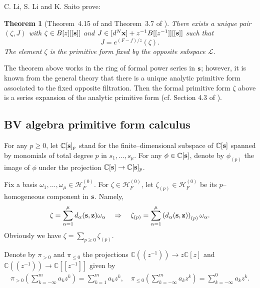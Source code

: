 \documentclass[12pt,a4paper]{amsart}
\newcommand{\CC}{{\mathbb{C}}}
\newcommand{\bx}{{\bf x}}
\newcommand{\bz}{{\bf z}}
\def\H{{\mathcal H}}
\def\L{{\mathcal L}}
\newcommand{\<}{\left<}
\renewcommand{\>}{\right>}
\newcommand{\bs}{{\bf s}}
\newtheorem{theorem}{Theorem}[section]
\numberwithin{equation}{section}
\begin{document}
C. Li, S. Li and K. Saito prove:
\begin{theorem}[Theorem~4.15 of \cite{LLS} and Theorem~3.7 of \cite{LLSS}]
    There exists a unique pair $(\zeta,J)$ with $\zeta \in B[z][[\bs]]$ and $J \in [d^N\bx] + z^{-1}B[[z^{-1}]][[\bs]]$ such that
    \begin{equation}\label{eq: main Jzeta}
        J = e^{(F-f)/z}(\zeta).
    \end{equation}
    The element $\zeta$ is the primitive form fixed by the opposite subspace $\L$.
\end{theorem}
The theorem above works in the ring of formal power series in $\bs$; however, it is known from the general theory that there is a unique analytic primitive form associated to the fixed opposite filtration. Then the formal primitive form $\zeta$ above is a series expansion of the analytic primitive form (cf. Section 4.3 of \cite{LLS}).

\subsection{BV algebra primitive form calculus}
For any $p \ge 0$, let $\CC[\bs]_p$ stand for the finite--dimensional subspace of $\CC[\bs]$ spanned by monomials of total degree $p$ in $s_1,\dots,s_\mu$. For any $\phi \in \CC[\bs]$, denote by $\phi_{(p)}$ the image of $\phi$ under the projection $\CC[\bs] \to \CC[\bs]_{p}$.

Fix a basis $\omega_1,\dots,\omega_\mu \in \H_F^{(0)}$.
For $\zeta \in \H_F^{(0)}$, let $\zeta_{(p)} \in \H_F^{(0)}$ be its $p$--homogeneous component in $\bs$. Namely,
\[
    \zeta = \sum_{\alpha=1}^\mu d_\alpha(\bs,\bz) \omega_\alpha
    \quad
    \Rightarrow
    \quad
    \zeta_{(p)} = \sum_{\alpha=1}^\mu \left( d_\alpha(\bs,\bz) \right)_{(p)}\omega_\alpha.
\]
Obviously we have $\zeta = \sum_{p \ge 0} \zeta_{(p)}$.

Denote by $\pi_{>0}$ and $\pi_{\le 0}$ the projections $\CC((z^{-1})) \to z\CC[z]$ and $\CC((z^{-1})) \to \CC[[z^{-1}]]$ given by
\begin{align*}
 \pi_{>0}(\sum_{k = -\infty}^m a_k z^k) = \sum_{k = 1}^m a_k z^k,
 \quad
 \pi_{\le 0}(\sum_{k = -\infty}^m a_k z^k) = \sum_{k = -\infty}^0 a_k z^k.
\end{align*}
\end{document}
